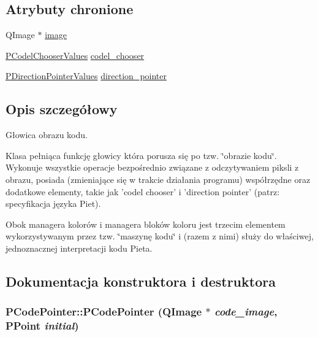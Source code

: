 \subsection*{Atrybuty chronione}
\begin{CompactItemize}
\item 
QImage $\ast$ \hyperlink{classPCodePointer_9f6689e6425046abd85001f915ba1221}{image}
\item 
\hyperlink{penums_8h_59dc57d526e2ce263bdf851c0d4fef3e}{PCodelChooserValues} \hyperlink{classPCodePointer_a3d7ea2563c9e1363ddcb0fb19b35f5a}{codel\_\-chooser}
\item 
\hyperlink{penums_8h_6d3256570150238c718cbbb5f81c82df}{PDirectionPointerValues} \hyperlink{classPCodePointer_b285be0011b9b5c8b35bd1ba27ee935f}{direction\_\-pointer}
\end{CompactItemize}


\subsection{Opis szczegółowy}
Głowica obrazu kodu. 

Klasa pełniąca funkcję głowicy która porusza się po tzw. \char`\"{}obrazie kodu\char`\"{}. Wykonuje wszystkie operacje bezpośrednio związane z odczytywaniem piksli z obrazu, posiada (zmieniające się w trakcie działania programu) współrzędne oraz dodatkowe elementy, takie jak 'codel chooser' i 'direction pointer' (patrz: specyfikacja języka Piet).

Obok managera kolorów i managera bloków koloru jest trzecim elementem wykorzystywanym przez tzw. \char`\"{}maszynę kodu\char`\"{} i (razem z nimi) służy do właściwej, jednoznacznej interpretacji kodu Pieta. 

\subsection{Dokumentacja konstruktora i destruktora}
\hypertarget{classPCodePointer_cd5cd1cd86ff9cf89ac6d2aae5cb52d8}{
\subsubsection[{PCodePointer}]{\setlength{\rightskip}{0pt plus 5cm}PCodePointer::PCodePointer (QImage $\ast$ {\em code\_\-image}, \/  {\bf PPoint} {\em initial})}}
\label{classPCodePointer_cd5cd1cd86ff9cf89ac6d2aae5cb52d8}


